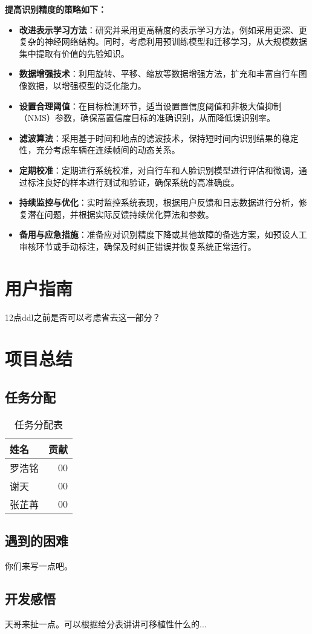 \documentclass{article}
\begin{document}
\textbf{提高识别精度的策略如下：}
\begin{itemize}
    \item \textbf{改进表示学习方法}：研究并采用更高精度的表示学习方法，例如采用更深、更复杂的神经网络结构。同时，考虑利用预训练模型和迁移学习，从大规模数据集中提取有价值的先验知识。
    
    \item \textbf{数据增强技术}：利用旋转、平移、缩放等数据增强方法，扩充和丰富自行车图像数据，以增强模型的泛化能力。
    
    \item \textbf{设置合理阈值}：在目标检测环节，适当设置置信度阈值和非极大值抑制（NMS）参数，确保高置信度目标的准确识别，从而降低误识别率。
    
    \item \textbf{滤波算法}：采用基于时间和地点的滤波技术，保持短时间内识别结果的稳定性，充分考虑车辆在连续帧间的动态关系。
    
    \item \textbf{定期校准}：定期进行系统校准，对自行车和人脸识别模型进行评估和微调，通过标注良好的样本进行测试和验证，确保系统的高准确度。
    
    \item \textbf{持续监控与优化}：实时监控系统表现，根据用户反馈和日志数据进行分析，修复潜在问题，并根据实际反馈持续优化算法和参数。
    
    \item \textbf{备用与应急措施}：准备应对识别精度下降或其他故障的备选方案，如预设人工审核环节或手动标注，确保及时纠正错误并恢复系统正常运行。
\end{itemize}

\section{用户指南}
12点ddl之前是否可以考虑省去这一部分？

\section{项目总结}
\subsection{任务分配}

\begin{table}[H]
\centering
\begin{tabular}{l|r}
姓名 & 贡献 \\\hline
罗浩铭 & 00 \\
谢天 & 00 \\
张芷苒 & 00
\end{tabular}
\caption{\label{tab:widgets}任务分配表}
\end{table}

\subsection{遇到的困难}

你们来写一点吧。

\subsection{开发感悟}

天哥来扯一点。可以根据给分表讲讲可移植性什么的...
\end{document}
